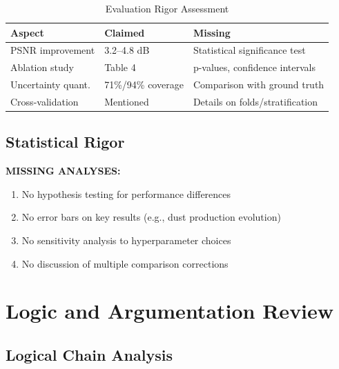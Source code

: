 \documentclass[12pt,a4paper]{article}
\newcommand{\critical}[1]{\textcolor{CriticalRed}{\textbf{#1}}}
\begin{document}
\begin{table}[h]
\centering
\caption{Evaluation Rigor Assessment}
\begin{tabular}{@{}lll@{}}
\toprule
\textbf{Aspect} & \textbf{Claimed} & \textbf{Missing} \\
\midrule
PSNR improvement & 3.2--4.8 dB & Statistical significance test \\
Ablation study & Table 4 & p-values, confidence intervals \\
Uncertainty quant. & 71\%/94\% coverage & Comparison with ground truth \\
Cross-validation & Mentioned & Details on folds/stratification \\
\bottomrule
\end{tabular}
\end{table}

\subsection{Statistical Rigor}

\critical{MISSING ANALYSES:}

\begin{enumerate}
    \item No hypothesis testing for performance differences
    \item No error bars on key results (e.g., dust production evolution)
    \item No sensitivity analysis to hyperparameter choices
    \item No discussion of multiple comparison corrections
\end{enumerate}

\section{Logic and Argumentation Review}

\subsection{Logical Chain Analysis}

\begin{center}
\end{center}
\end{document}
